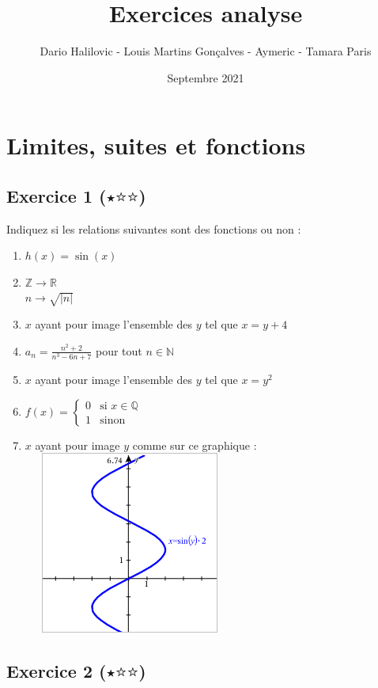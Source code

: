 \documentclass{article}
\title{Exercices analyse}
\author{Dario Halilovic - Louis Martins Gonçalves - Aymeric - Tamara Paris}
\date{Septembre 2021}
\begin{document}
\maketitle

\section{Limites, suites et fonctions}
\subsection*{Exercice 1 ($\medblackstar \medwhitestar \medwhitestar$)}

Indiquez si les relations suivantes sont des fonctions ou non :
\begin{enumerate}
    \item $h(x) = \sin(x)$
    \item $\mathbb{Z} \to \mathbb{R}$\\
    $n \to \sqrt{\lvert n \rvert}$
    \item $x$ ayant pour image l'ensemble des $y$ tel que $x = y + 4$
    \item $a_n = \frac{n^2 + 2}{n^3 - 6n + 7}$ pour tout $n \in \mathbb{N}$
    \item $x$ ayant pour image l'ensemble des $y$ tel que $x = y^2$
    \item $f(x) = \left\{
    \begin{array}{ll}
        0 & \mbox{si } x \in \mathbb{Q}\\
        1 & \mbox{sinon}
        \end{array}
    \right.$
    \item $x$ ayant pour image $y$ comme sur ce graphique :\\
    \includegraphics[width=7cm, height=6cm]{TextToGraph_2.png}
\end{enumerate}


\subsection*{Exercice 2 ($\medblackstar \medwhitestar \medwhitestar$)}
\end{document}
